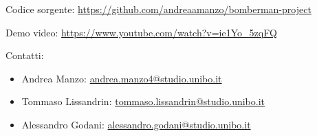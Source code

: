 \documentclass[a4paper,11pt]{article}
\begin{document}
Codice sorgente:
\url{https://github.com/andreaamanzo/bomberman-project}

\bigskip

Demo video:
\url{https://www.youtube.com/watch?v=ie1Yo_5zqFQ}

\bigskip

Contatti:
\begin{itemize}
    \item Andrea Manzo: \href{mailto:andrea.manzo4@studio.unibo.it}{andrea.manzo4@studio.unibo.it}
    \item Tommaso Lissandrin: \href{mailto:tommaso.lissandrin@studio.unibo.it}{tommaso.lissandrin@studio.unibo.it}
    \item Alessandro Godani: \href{mailto:alessandro.godani@studio.unibo.it}{alessandro.godani@studio.unibo.it}
\end{itemize}
\end{document}

